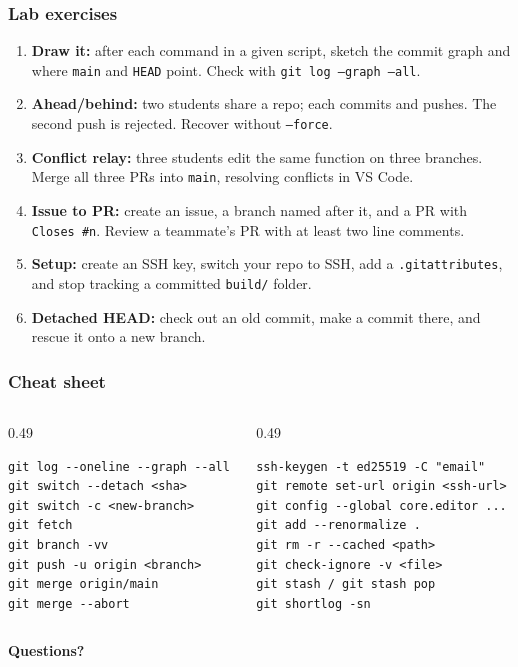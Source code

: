 \documentclass[aspectratio=169,10pt,compress]{beamer}
\newcommand{\cmd}[1]{\texttt{\color{gitred}#1}}
\begin{document}
\begin{frame}[t,fragile] \frametitle{Lab exercises}
  \begin{enumerate}\small
    \item \textbf{Draw it:} after each command in a given script, sketch the commit graph
          and where \texttt{main} and \texttt{HEAD} point. Check with \cmd{git log --graph --all}.
    \item \textbf{Ahead/behind:} two students share a repo; each commits and pushes.
          The second push is rejected. Recover without \texttt{--force}.
    \item \textbf{Conflict relay:} three students edit the same function on three branches.
          Merge all three PRs into \texttt{main}, resolving conflicts in VS Code.
    \item \textbf{Issue to PR:} create an issue, a branch named after it, and a PR with
          \texttt{Closes \#n}. Review a teammate's PR with at least two line comments.
    \item \textbf{Setup:} create an SSH key, switch your repo to SSH, add a
          \texttt{.gitattributes}, and stop tracking a committed \texttt{build/} folder.
    \item \textbf{Detached HEAD:} check out an old commit, make a commit there, and rescue it
          onto a new branch.
  \end{enumerate}
\end{frame}

\begin{frame}[t,fragile] \frametitle{Cheat sheet}
  \begin{columns}[T]
    \begin{column}{0.49\textwidth}
\begin{lstlisting}
git log --oneline --graph --all
git switch --detach <sha>
git switch -c <new-branch>
git fetch
git branch -vv
git push -u origin <branch>
git merge origin/main
git merge --abort
\end{lstlisting}
    \end{column}
    \begin{column}{0.49\textwidth}
\begin{lstlisting}
ssh-keygen -t ed25519 -C "email"
git remote set-url origin <ssh-url>
git config --global core.editor ...
git add --renormalize .
git rm -r --cached <path>
git check-ignore -v <file>
git stash / git stash pop
git shortlog -sn
\end{lstlisting}
    \end{column}
  \end{columns}

  \vspace{1em}
  \begin{center}
    {\Large \textbf{Questions?}}
  \end{center}
\end{frame}
\end{document}
